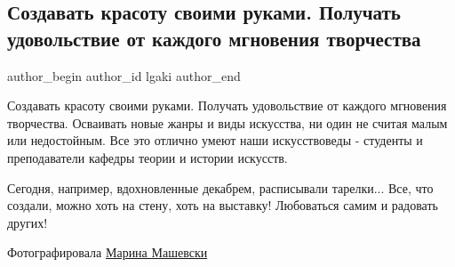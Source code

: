  
 
 
 
 
 
\subsection{Создавать красоту своими руками. Получать удовольствие от каждого мгновения творчества}
\label{sec:26_12_2021.fb.lgaki.1.tvorchestvo_krasota}
 
\ifcmt
 author_begin
   author_id lgaki
 author_end
\fi

Создавать красоту своими руками. Получать удовольствие от каждого мгновения
творчества. Осваивать новые жанры и виды искусства, ни один не считая малым или
недостойным. Все это отлично умеют наши искусствоведы - студенты и
преподаватели кафедры теории и истории искусств.


Сегодня, например, вдохновленные декабрем, расписывали тарелки... Все, что
создали, можно хоть на стену, хоть на выставку! Любоваться самим и радовать
других!

Фотографировала \href{https://www.facebook.com/maryna.maschewsky}{Марина Машевски}


